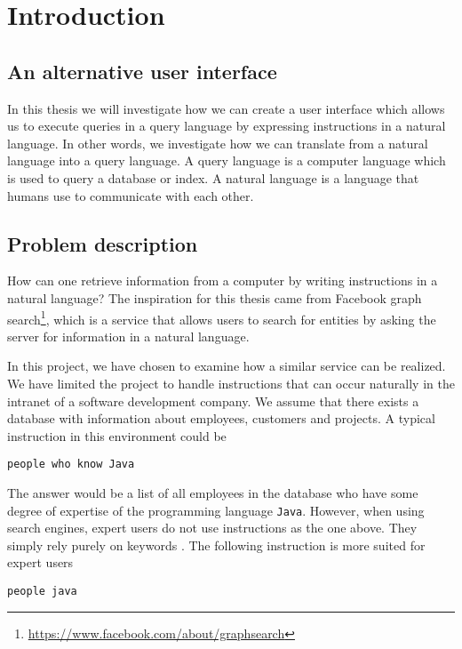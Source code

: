 \chapter{Introduction}\label{ch:introduction}
\section{An alternative user interface}
In this thesis we will investigate how we can create a user interface which allows us to execute queries in a query language by expressing instructions in a natural language. In other words, we investigate how we can translate from a natural language into a query language. A query language is a computer language which is used to query a database or index. A natural language is a language that humans use to communicate with each other.

\section{Problem description\label{sec:problem-description}}
How can one retrieve information from a computer by writing instructions in a natural language? The inspiration for this thesis came from Facebook graph search\footnote{\url{https://www.facebook.com/about/graphsearch}}, which is a service that allows users to search for entities by asking the server for information in a natural language.

In this project, we have chosen to examine how a similar service can be realized. We have limited the project to handle instructions that can occur naturally in the intranet of a software development company. We assume that there exists a database with information about employees, customers and projects. A typical instruction in this environment could be

\begin{verbatim}
people who know Java
\end{verbatim}

The answer would be a list of all employees in the database who have some degree of expertise of the programming language \texttt{Java}. However, when using search engines, expert users do not use instructions as the one above. They simply rely purely on keywords \cite{mayer:2007}. The following instruction is more suited for expert users

\begin{verbatim}
people java
\end{verbatim}

